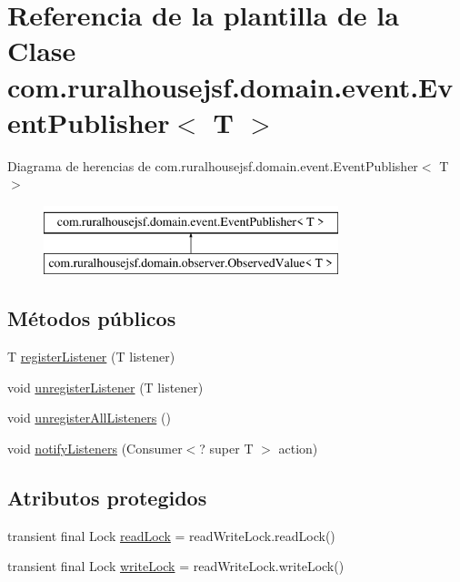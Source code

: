 \hypertarget{a00168}{}\section{Referencia de la plantilla de la Clase com.\+ruralhousejsf.\+domain.\+event.\+Event\+Publisher$<$ T $>$}
\label{a00168}
Diagrama de herencias de com.\+ruralhousejsf.\+domain.\+event.\+Event\+Publisher$<$ T $>$\begin{figure}[H]
\begin{center}
\leavevmode
\includegraphics[height=2.000000cm]{a00168}
\end{center}
\end{figure}
\subsection*{Métodos públicos}
\begin{DoxyCompactItemize}
\item 
T \mbox{\hyperlink{a00168_a65329dd472a54e80c4f024ae2d30f5c2}{register\+Listener}} (T listener)
\item 
void \mbox{\hyperlink{a00168_a148baf3f922934d82a7042f70959b516}{unregister\+Listener}} (T listener)
\item 
void \mbox{\hyperlink{a00168_aba48051da7096e2451b0a4f2d92eef40}{unregister\+All\+Listeners}} ()
\item 
void \mbox{\hyperlink{a00168_a7bd776be1bff02b358cfae8b22f33b73}{notify\+Listeners}} (Consumer$<$? super T $>$ action)
\end{DoxyCompactItemize}
\subsection*{Atributos protegidos}
\begin{DoxyCompactItemize}
\item 
transient final Lock \mbox{\hyperlink{a00168_a5ffe504fad62f049d51a80fb912b97f5}{read\+Lock}} = read\+Write\+Lock.\+read\+Lock()
\item 
transient final Lock \mbox{\hyperlink{a00168_a1ed2aa95b3bceee1d543a0d0d7297171}{write\+Lock}} = read\+Write\+Lock.\+write\+Lock()
\end{DoxyCompactItemize}
